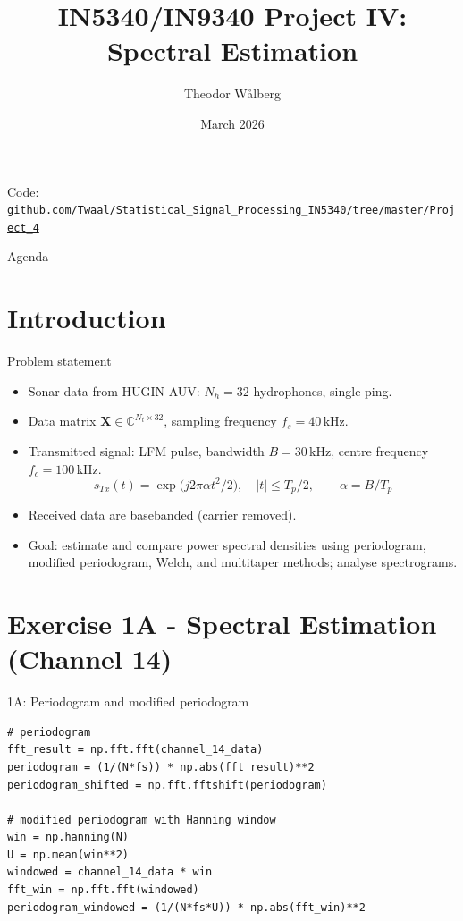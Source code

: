 \documentclass[aspectratio=169,10pt]{beamer}
\title[IN5340 Project IV]{IN5340/IN9340 Project IV: Spectral Estimation}
\author{Theodor W\aa lberg}
\institute{University of Oslo}
\date{March 2026}
\begin{document}
\begin{frame}
\titlepage
\vspace{-1.0em}
\centering
\footnotesize
Code: \href{https://github.com/Twaal/Statistical_Signal_Processing_IN5340/tree/master/Project_4}{\nolinkurl{github.com/Twaal/Statistical_Signal_Processing_IN5340/tree/master/Project_4}}
\end{frame}

\begin{frame}{Agenda}
\tableofcontents
\end{frame}

\section{Introduction}

\begin{frame}{Problem statement}
\begin{itemize}
\item Sonar data from HUGIN AUV: $N_h=32$ hydrophones, single ping.
\item Data matrix $\mathbf{X}\in\mathbb{C}^{N_t\times 32}$, sampling frequency $f_s=40\,$kHz.
\item Transmitted signal: LFM pulse, bandwidth $B=30\,$kHz, centre frequency $f_c=100\,$kHz.
\[
s_{Tx}(t) = \exp\!\bigl(j2\pi\alpha t^2/2\bigr),\quad |t|\le T_p/2, \qquad \alpha = B/T_p
\]
\item Received data are basebanded (carrier removed).
\item Goal: estimate and compare power spectral densities using periodogram, modified periodogram, Welch, and multitaper methods; analyse spectrograms.
\end{itemize}
\end{frame}

\section{Exercise 1A - Spectral Estimation (Channel 14)}

\begin{frame}[fragile]{1A: Periodogram and modified periodogram}
\scriptsize
\begin{verbatim}
# periodogram
fft_result = np.fft.fft(channel_14_data)
periodogram = (1/(N*fs)) * np.abs(fft_result)**2
periodogram_shifted = np.fft.fftshift(periodogram)

# modified periodogram with Hanning window
win = np.hanning(N)
U = np.mean(win**2)
windowed = channel_14_data * win
fft_win = np.fft.fft(windowed)
periodogram_windowed = (1/(N*fs*U)) * np.abs(fft_win)**2
\end{verbatim}
\end{frame}
\end{document}
